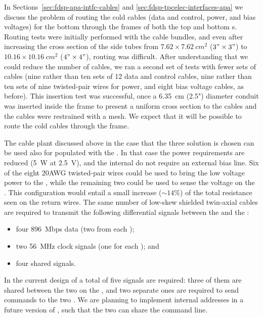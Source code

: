 In Sections~\ref{sec:fdsp-apa-intfc-cables} and \ref{sec:fdsp-tpcelec-interfaces-apa}
we discuss the problem of routing the cold cables (data and control, power, and
bias voltages) for the bottom  through the frames of both
the top and bottom s. Routing tests were initially performed
with the  cable bundles, and even after increasing
the cross section of the side tubes from $\num{7.62}\times\SI{7.62}{cm^2}$ ($3"\times3"$)
to $\num{10.16}\times\SI{10.16}{cm^2}$ ($4"\times4"$), routing was difficult. After understanding that we
could reduce the number of cables, we ran a second set of tests with fewer sets
of cables (nine rather than ten sets of 12 data and control cables, nine rather than
ten sets of nine twisted-pair wires for power, and eight bias voltage cables, as before).
This insertion test was successful, once
a \SI{6.35}{cm} (2.5") diameter conduit was inserted inside the
 frame to present a uniform cross section to
the cables and the cables were restrained with a mesh. We expect that it will be possible
to route the cold cables through the  frame.

The cable plant discussed above in the case that the three 
solution is chosen can be used also for  populated with the
 . In that case the power requirements are 
reduced (\SI{5}{W} at \SI{2.5}{V}), and the internal  do
not require an external bias line. Six of the eight \num{20}{AWG} twisted-pair
wires could be used to bring the low voltage power to the ,
while the remaining two could be used to sense the voltage on the .
This configuration would entail a small increase ($\sim14$\%) of the 
total resistance seen on the return wires. The same number of low-skew shielded
twin-axial cables are required to transmit the following differential signals
between the  and the :
\begin{itemize}
\item four \SI{896}{Mbps} data (two from each );
\item two \SI{56}{MHz} clock signals (one for each ); and
\item four shared  signals.
\end{itemize}
In the current design of  a total of five  signals
are required: three of them are shared between the two  on the
, and two separate ones are required to send commands to the
two  . We are planning to implement internal 
addresses in a future version of , such that the two 
can share the command line.

